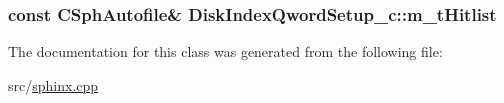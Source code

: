 \hypertarget{classDiskIndexQwordSetup__c_ac1f81f6e9647c7413313228debfe10a0}{
\subsubsection[{m\-\_\-t\-Hitlist}]{\setlength{\rightskip}{0pt plus 5cm}const {\bf C\-Sph\-Autofile}\& Disk\-Index\-Qword\-Setup\-\_\-c\-::m\-\_\-t\-Hitlist}}\label{classDiskIndexQwordSetup__c_ac1f81f6e9647c7413313228debfe10a0}


The documentation for this class was generated from the following file\-:\begin{DoxyCompactItemize}
\item 
src/\hyperlink{sphinx_8cpp}{sphinx.\-cpp}\end{DoxyCompactItemize}
